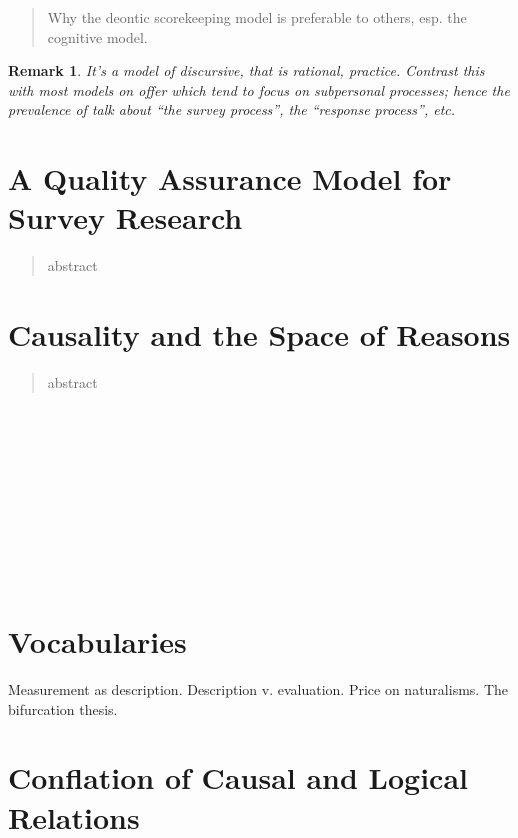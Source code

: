 \documentclass[11pt,twoside]{article}
\newtheorem{remark}{Remark}
\newcommand{\SR}{Survey Research}
\begin{document}
\begin{abstract}
Why the deontic scorekeeping model is preferable to others, esp. the
cognitive model.
\end{abstract}

\begin{remark}
  It's a model of discursive, that is rational, practice.  Contrast
  this with most models on offer which tend to focus on subpersonal
  processes; hence the prevalence of talk about ``the survey
  process'', the ``response process'', etc.
\end{remark}

\section{A Quality Assurance Model for \SR{}}

\begin{abstract}
abstract
\end{abstract}

\section{Causality and the Space of Reasons}

\begin{abstract}
abstract
\end{abstract}

\noindent
\cite{abell_narrative_2004} \\
\cite{crane_mental_1995} \\
\cite{gross_pragmatist_2009} \\
\cite{jackson_mental_1996} \\
\cite{lowe_causal_1993} \\
\cite{lowe_non-cartesian_2006} \\
\cite{macdonald_mental_1986} \\
\cite{menzies_causation_1993} \\
\cite{morris_causes_1986} \\
\cite{williamson_broadness_1998}

\section{Vocabularies}

Measurement as description.  Description v. evaluation.  Price on
naturalisms.  The bifurcation thesis.

\section{Conflation of Causal and Logical Relations}
\end{document}
